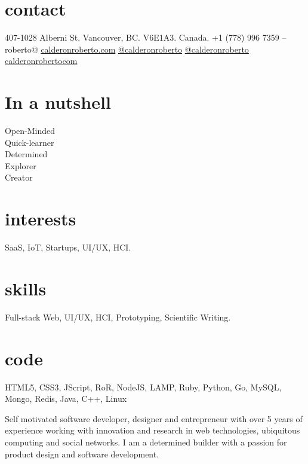\documentclass[full]{rvca}
\begin{document}


\begin{aside} %
\section{contact}
407-1028 Alberni St.
Vancouver, BC.
V6E1A3. Canada.
+1 (778) 996 7359
--
roberto@
\href{http://calderonroberto.com}{calderonroberto.com}
\emph{ } %
\TwitterIcon  \href{http://twitter.com/calderonroberto}{@calderonroberto} 
\GithubIcon \href{https://github.com/calderonroberto}{@calderonroberto} 
\LinkedinIcon \href{https://ca.linkedin.com/in/calderonrobertocom}{calderonrobertocom} 
%
\QrCode
%
\section{In a nutshell}
Open-Minded\\Quick-learner\\Determined\\Explorer\\Creator 
% 
\section{interests}
SaaS, IoT, Startups, UI/UX, HCI.
%
\section{skills}
Full-stack Web, UI/UX,
HCI, Prototyping, 
Scientific Writing.
% 
\section{code}
HTML5, CSS3, \HeartIcon JScript, 
\HeartIcon RoR, \HeartIcon NodeJS, LAMP,
\HeartIcon Ruby, Python, \HeartIcon Go,
MySQL, Mongo, Redis,
Java, C++, \HeartIcon Linux
\end{aside}


\begin{statement}
Self motivated software developer, designer and entrepreneur with over 5 years of experience working with innovation and research in web technologies, ubiquitous computing and social networks. I am a determined builder with a passion for product design and software development.
\end{statement}
\end{document}
